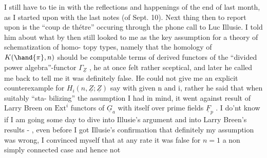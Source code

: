 I still have to tie in with the reflections and happenings of the end
of last month, as I started upon with the last notes (of Sept. 10). Next
thing then to report upon is the ``coup de th\'etre'' occuring through 
the phone call to Luc Illusie.  I told him about what by then still
looked to me as the key assumption for a theory of schematization of homo-%
topy types, namely that the homology of $K(\hand{\pi},n)$ should be computable 
terms of derived functors of the ``divided power algebra''-functor $\Gamma_{\underline{Z}}$ , he
at once felt rather sceptical, and later he called me back to tell me it
was definitely false. He could not give me an explicit counterexample for
$H_{i}(n,\underline{Z};\underline{Z})$ say with given n and i, rather he said that when suitably ``sta-%
bilizing'' the assumption I had in mind, it went against result of Larry
Breen on $\mathrm{Ext}^{i}$ functors of $\underline{G}_{a}$ with itself over prime fields $\underline{F}_{p}$ . I do'nt
know if I am going some day to dive into Illusie's argument and into Larry
Breen's results - , even before I got Illusie's confirmation
that definitely my assumption was wrong, I convinced myself that at any
rate it was false for $n=1$   a non simply connected case and hence not

